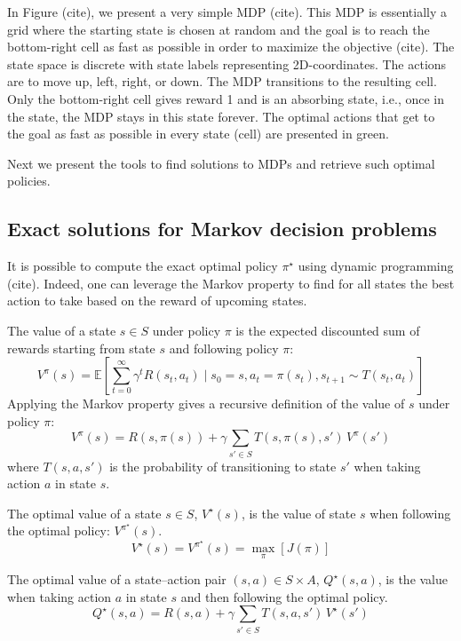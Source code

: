 In Figure (cite), we present a very simple MDP (cite).
This MDP is essentially a grid where the starting state is chosen at random and the goal is to reach the bottom-right cell as fast as possible in order to maximize the objective (cite).
The state space is discrete with state labels representing 2D-coordinates.
The actions are to move up, left, right, or down. The MDP transitions to the resulting cell. 
Only the bottom-right cell gives reward 1 and is an absorbing state, i.e., once in the state, the MDP stays in this state forever.
The optimal actions that get to the goal as fast as possible in every state (cell) are presented in green.

Next we present the tools to find solutions to MDPs and retrieve such optimal policies.

\subsection{Exact solutions for Markov decision problems}
It is possible to compute the exact optimal policy $\pi^\star$ using dynamic programming (cite).
Indeed, one can leverage the Markov property to find for all states the best action to take based on the reward of upcoming states.
\begin{definition} The value of a state $s\in S$ under policy $\pi$ is the expected discounted sum of rewards starting from state $s$ and following policy $\pi$:
    $$V^\pi(s) = \mathbb{E}\left[\sum_{t=0}^{\infty} \gamma^t R(s_t, a_t) \mid s_0 = s, a_t = \pi(s_t), s_{t+1} \sim T(s_t, a_t)\right]$$
    Applying the Markov property gives a recursive definition of the value of $s$ under policy $\pi$:
    $$V^\pi(s) = R(s,\pi(s)) + \gamma \sum_{s' \in S} T(s,\pi(s),s')\,V^\pi(s')$$
    where $T(s,a,s')$ is the probability of transitioning to state $s'$ when taking action $a$ in state $s$.
\end{definition}
\begin{definition} The optimal value of a state $s\in S$, $V^\star(s)$, is the value of state $s$ when following the optimal policy: $V^{\pi^{\star}}(s)$.
    $$V^{\star}(s) = V^{\pi^{\star}}(s) = \underset{\pi}{\max}\left[J(\pi)\right]$$
\end{definition}
\begin{definition} The optimal value of a state–action pair $(s,a)\in S\times A$, $Q^\star(s,a)$, is the value when taking action $a$ in state $s$ and then following the optimal policy.
    $$Q^{\star}(s,a) = R(s, a) + \gamma\sum_{s'\in S} T(s,a,s')\,V^{\star}(s')$$
\end{definition}

